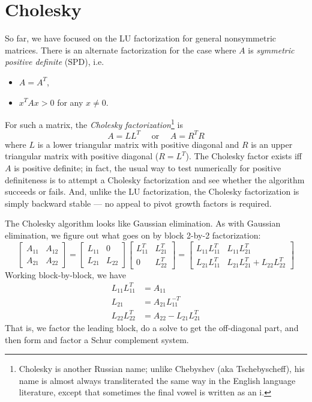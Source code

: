 \documentclass[12pt, leqno]{article}
\begin{document}

\section{Cholesky}

So far, we have focused on the LU factorization for general
nonsymmetric matrices.  There is an alternate factorization
for the case where $A$ is {\em symmetric positive definite} (SPD),
i.e.
\begin{itemize}
\item $A = A^T$,
\item $x^T A x > 0$ for any $x \neq 0$.
\end{itemize}
For such a matrix, the {\em Cholesky factorization}\footnote{Cholesky
  is another Russian name; unlike Chebyshev (aka Tschebyscheff), his
  name is almost always transliterated the same way in the English
  language literature, except that sometimes the final vowel is
  written as an i.} is
\[
  A = LL^T \quad \mbox{ or } \quad A = R^T R
\]
where $L$ is a lower triangular matrix with positive diagonal and $R$
is an upper triangular matrix with positive diagonal ($R = L^T$).  The
Cholesky factor exists iff $A$ is positive definite; in fact, the
usual way to test numerically for positive definiteness is to attempt
a Cholesky factorization and see whether the algorithm succeeds or
fails.  And, unlike the LU factorization, the Cholesky factorization
is simply backward stable --- no appeal to pivot growth factors is required.

The Cholesky algorithm looks like Gaussian elimination.  As
with Gaussian elimination, we figure out what goes on
by block 2-by-2 factorization:
\[
\begin{bmatrix} A_{11} & A_{12} \\ A_{21} & A_{22} \end{bmatrix} =
\begin{bmatrix} L_{11} & 0 \\ L_{21} & L_{22} \end{bmatrix}
\begin{bmatrix} L_{11}^T & L_{21}^T \\ 0 & L_{22}^T \end{bmatrix} =
\begin{bmatrix}
  L_{11} L_{11}^T & L_{11} L_{21}^T \\
  L_{21} L_{11}^T & L_{21} L_{21}^T+ L_{22} L_{22}^T
\end{bmatrix}
\]
Working block-by-block, we have
\begin{align*}
  L_{11} L_{11}^T &= A_{11} \\
  L_{21} &= A_{21} L_{11}^{-T} \\
  L_{22} L_{22}^T &= A_{22} - L_{21} L_{21}^T
\end{align*}
That is, we factor the leading block, do a solve to get the
off-diagonal part, and then form and factor a Schur complement
system.
\end{document}

